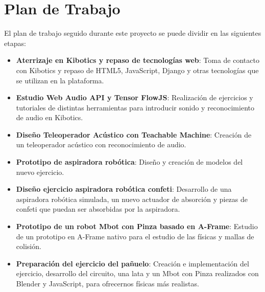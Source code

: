 \section{Plan de Trabajo}
El plan de trabajo seguido durante este proyecto se puede dividir en las siguientes etapas:


\begin{itemize}
    \item \textbf{Aterrizaje en Kibotics y repaso de tecnologías web}: Toma de contacto con Kibotics y repaso de HTML5, JavaScript, Django y otras tecnologías que se utilizan en la plataforma.
    
    \item \textbf{Estudio Web Audio API y Tensor FlowJS}: Realización de ejercicios y tutoriales de distintas herramientas para introducir sonido y reconocimiento de audio en Kibotics.
   
    \item \textbf{Diseño Teleoperador Acústico con Teachable Machine}: Creación de un teleoperador acústico con reconocimiento de audio. 

    \item \textbf{Prototipo de aspiradora robótica}: Diseño y creación de modelos del nuevo ejercicio.
    \item \textbf{Diseño ejercicio aspiradora robótica confeti}: Desarrollo de una aspiradora robótica simulada, un nuevo actuador de absorción y piezas de confeti que puedan ser absorbidas por la aspiradora.
    
    \item \textbf{Prototipo de un robot Mbot con Pinza basado en A-Frame}: Estudio de un prototipo en A-Frame nativo para el estudio de las físicas y mallas de colisión. 
    \item \textbf{Preparación del ejercicio del pañuelo}: Creación e implementación del ejercicio, desarrollo del circuito, una lata y un Mbot con Pinza realizados con Blender y JavaScript, para ofrecernos físicas más realistas.

\end{itemize}

